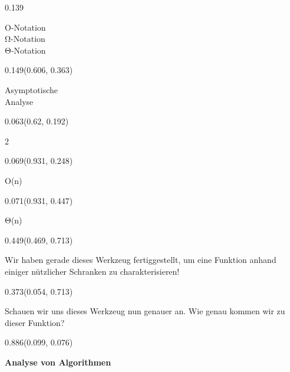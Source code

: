 \documentclass[aspectratio=169]{beamer}
\begin{document}
\begin{frame}[fragile]
\begin{textblock}{0.139}
  \begin{minipage}[t][0.161\paperheight]{\linewidth}
    {\small O-Notation\\Ω-Notation\\Θ-Notation}
  \end{minipage}
\end{textblock}
\begin{textblock}{0.149}(0.606, 0.363)
  \begin{minipage}[t][0.103\paperheight]{\linewidth}
    {\small Asymptotische\\Analyse}
  \end{minipage}
\end{textblock}
\begin{textblock}{0.063}(0.62, 0.192)
  \begin{minipage}[t][0.111\paperheight]{\linewidth}
    {\tiny 2}
  \end{minipage}
\end{textblock}
\begin{textblock}{0.069}(0.931, 0.248)
  \begin{minipage}[t][0.067\paperheight]{\linewidth}
    {\tiny O(n)}
  \end{minipage}
\end{textblock}
\begin{textblock}{0.071}(0.931, 0.447)
  \begin{minipage}[t][0.067\paperheight]{\linewidth}
    {\tiny Θ(n)}
  \end{minipage}
\end{textblock}
\begin{textblock}{0.449}(0.469, 0.713)
  \begin{minipage}[t][0.135\paperheight]{\linewidth}
    {\small Wir haben gerade dieses Werkzeug fertiggestellt, um eine Funktion anhand einiger nützlicher Schranken zu charakterisieren!}
  \end{minipage}
\end{textblock}
\begin{textblock}{0.373}(0.054, 0.713)
  \begin{minipage}[t][0.135\paperheight]{\linewidth}
    {\small Schauen wir uns dieses Werkzeug nun genauer an. Wie genau kommen wir zu dieser Funktion?}
  \end{minipage}
\end{textblock}
\begin{textblock}{0.886}(0.099, 0.076)
  \begin{minipage}[t][0.131\paperheight]{\linewidth}
    \textbf{Analyse von Algorithmen}

\end{minipage}
\end{textblock}
\end{frame}
\end{document}
